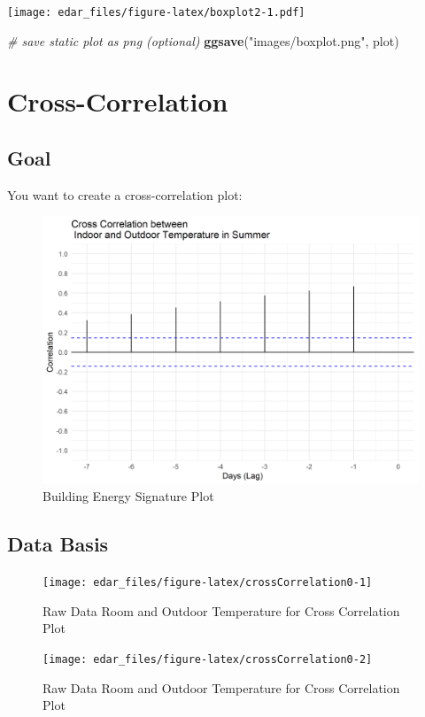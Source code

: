 \documentclass[
  a4paperpaper,
]{book}
\newenvironment{Shaded}{\begin{snugshade}}{\end{snugshade}}
\newcommand{\CommentTok}[1]{\textcolor[rgb]{0.56,0.35,0.01}{\textit{#1}}}
\newcommand{\KeywordTok}[1]{\textcolor[rgb]{0.13,0.29,0.53}{\textbf{#1}}}
\newcommand{\NormalTok}[1]{#1}
\newcommand{\StringTok}[1]{\textcolor[rgb]{0.31,0.60,0.02}{#1}}
\let\oldShaded\Shaded
\let\endoldShaded\endShaded
\renewenvironment{Shaded}{\footnotesize\oldShaded}{\endoldShaded}
\begin{document}
\texttt{[image: edar\_files/figure-latex/boxplot2-1.pdf]}

\begin{Shaded}
\begin{Highlighting}[]
\CommentTok{# save static plot as png (optional)}
\KeywordTok{ggsave}\NormalTok{(}\StringTok{"images/boxplot.png"}\NormalTok{, plot)}
\end{Highlighting}
\end{Shaded}

\newpage

\hypertarget{cross-correlation}{%
\section{Cross-Correlation}\label{cross-correlation}}

\hypertarget{goal-15}{%
\subsection{Goal}\label{goal-15}}

You want to create a cross-correlation plot:

\begin{figure}
\includegraphics[width=0.7\linewidth]{images/crossCorrelation} \caption{Building Energy Signature Plot}\label{fig:unnamed-chunk-24}
\end{figure}

\hypertarget{data-basis-15}{%
\subsection{Data Basis}\label{data-basis-15}}

\begin{figure}
\texttt{[image: edar\_files/figure-latex/crossCorrelation0-1]} \caption{Raw Data Room and Outdoor Temperature for Cross Correlation Plot}\label{fig:crossCorrelation0-1}
\end{figure}
\begin{figure}
\texttt{[image: edar\_files/figure-latex/crossCorrelation0-2]} \caption{Raw Data Room and Outdoor Temperature for Cross Correlation Plot}\label{fig:crossCorrelation0-2}
\end{figure}
\end{document}
